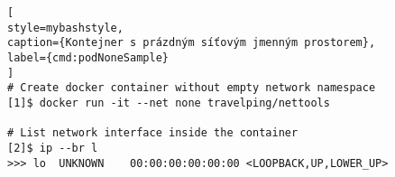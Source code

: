 \begin{lstfloat}
\begin{lstlisting}[
style=mybashstyle,
caption={Kontejner s prázdným síťovým jmenným prostorem},
label={cmd:podNoneSample}
]
# Create docker container without empty network namespace
[1]$ docker run -it --net none travelping/nettools

# List network interface inside the container 
[2]$ ip --br l
>>> lo  UNKNOWN    00:00:00:00:00:00 <LOOPBACK,UP,LOWER_UP>
\end{lstlisting}
\end{lstfloat}